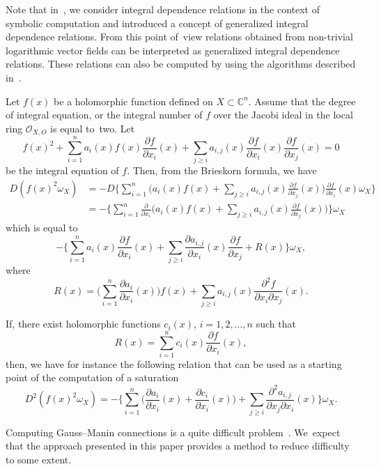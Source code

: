 \documentclass[10pt,a4paper]{amsart}
\numberwithin{equation}{section}
\begin{document}
Note that in~\cite{NT20}, we consider integral dependence relations in the context of symbolic computation and introduced a concept of generalized integral dependence relations. From this point of~view relations obtained from non-trivial logarithmic vector fields can be interpreted as genera\-lized integral dependence relations. These relations can also be computed by using the algorithms described in~\cite{NT20}.

Let $ f(x) $ be a holomorphic function defined on $X \subset {\mathbb C}^n$. Assume that the degree of integral equation, or the integral number of $f$ over the Jacobi ideal in the local ring ${\mathcal O}_{X,O}$ is equal to~two. Let
\[
f(x)^2 + \sum_{i=1}^{n} a_i(x)f(x)\frac{\partial f}{\partial x_i}(x)+ \sum_{j \ge i} a_{i,j}(x)
\frac{\partial f}{\partial x_i}(x)\frac{\partial f}{\partial x_j}(x) = 0
\]
be the integral equation of $f$. Then, from the Brieskorn formula, we have
\begin{align*}
D(f(x)^2\omega_X) &= -D\Bigg\{ \sum_{i=1}^{n}\Bigg(a_i(x)f(x) + \sum_{j \ge i} a_{i,j}(x)\frac{\partial f}{\partial x_j}(x)\Bigg)\frac{\partial f}{\partial x_i}(x) \omega_X \Bigg\}
\\
&=-\Bigg\{ \sum_{i=1}^{n}\frac{\partial}{\partial x_i} \Bigg(a_i(x)f(x) + \sum_{j \ge i}
 a_{i,j}(x)\frac{\partial f}{\partial x_j}(x)\Bigg) \Bigg\} \omega_X
\end{align*}
which is equal to
\[
-\Bigg\{ \sum_{i=1}^{n}a_i(x)\frac{\partial f}{\partial x_i}(x) +
 \sum_{j \ge i} \frac{\partial a_{i,j}}{\partial x_i}(x)\frac{\partial f} {\partial x_j} + R(x) \Bigg\} \omega_X,
 \]
where
\[
R(x) = \bigg( \sum_{i=1}^{n} \frac{\partial a_i}{\partial x_i}(x)\bigg)f(x) +
 \sum_{j \ge i} a_{i,j}(x)\frac{\partial^2 f}{\partial x_i \partial x_j} (x).
 \]

If, there exist holomorphic functions $c_i(x)$, $i=1,2,\ldots,n$ such that
\[
R(x) = \sum_{i=1}^{n} c_i(x)\frac{\partial f}{\partial x_i}(x),
\]
then, we have for instance the following relation that can be used as a starting point of the computation of a saturation
\[
D^2(f(x)^2\omega_X) = -\Bigg\{ \sum_{i=1}^{n} \bigg(\frac{\partial a_i}{\partial x_i}(x)
+ \frac{\partial c_i}{\partial x_i}(x) \bigg) + \sum_{ j \ge i}
\frac{\partial^2 a_{i,j}}{\partial x_j \partial x_i}(x) \Bigg\} \omega_X.
 \]

Computing Gauss--Manin connections is a quite difficult problem~\cite{D,Gu,Sch,Sch93,vS}. We~expect that the approach presented in this paper provides a method to reduce difficulty to some extent.
\end{document}
